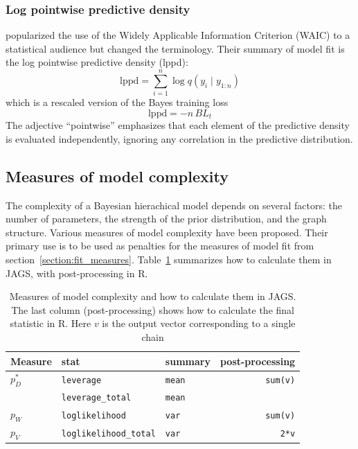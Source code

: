 \documentclass[11pt, a4paper, titlepage]{report}
\newcommand{\JAGS}{\textsf{JAGS}}
\begin{document}
{\subsubsection{Log pointwise predictive density}

\citet{Gelman2014} popularized the use of the Widely
Applicable Information Criterion (WAIC) to a statistical audience but
changed the terminology. Their summary of model fit is the log
pointwise predictive density (lppd):
\[
\text{lppd} = \sum_{i=1}^n \log q(y_i \mid y_{1:n})
\]
which is a rescaled version of the Bayes training loss
\[
\text{lppd} = - n \, BL_t
\]
The adjective ``pointwise'' emphasizes that each element of the predictive density is
evaluated independently, ignoring any correlation in the predictive distribution.

\subsection{Measures of model complexity}
\label{section:complexity_measures}

The complexity of a Bayesian hierachical model depends on several
factors: the number of parameters, the strength of the prior
distribution, and the graph structure. Various measures of model
complexity have been proposed. Their primary use is to be used as
penalties for the measures of model fit from
section~\ref{section:fit_measures}. Table~\ref{table:complexity_measures}
summarizes how to calculate them in \JAGS, with post-processing in R.

\begin{table}[htb]
  \centering
  \begin{tabular}{lllr}
    \hline
    Measure  & stat                       & summary    & post-processing \\
    \hline
    $p^*_D$  & {\tt leverage}             & {\tt mean} & {\tt sum(v)} \\
    & {\tt leverage\_total}      & {\tt mean} &              \\
    $p_W$    & {\tt loglikelihood}        & {\tt var}  & {\tt sum(v)} \\
    $p_V$    & {\tt loglikelihood\_total} & {\tt var}  & {\tt 2*v}    \\
    \hline
  \end{tabular}
  \caption{\label{table:complexity_measures} Measures of model
    complexity and how to calculate them in \JAGS.  The last column
    (post-processing) shows how to calculate the final statistic in
    R. Here $v$ is the output vector corresponding to a single chain}
\end{table}


}
\end{document}
